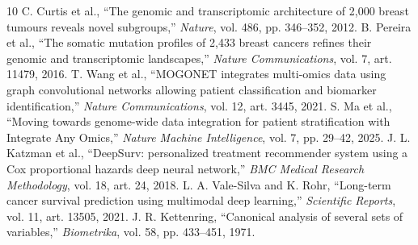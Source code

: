\documentclass{article}
\begin{document}
\begin{thebibliography}{10}\small
{} C. Curtis et al., ``The genomic and transcriptomic architecture
of 2,000 breast tumours reveals novel subgroups,'' \emph{Nature}, vol. 486,
pp. 346--352, 2012.
 B. Pereira et al., ``The somatic mutation profiles of 2,433
breast cancers refines their genomic and transcriptomic landscapes,''
\emph{Nature Communications}, vol. 7, art. 11479, 2016.
 T. Wang et al., ``MOGONET integrates multi-omics data using
graph convolutional networks allowing patient classification and biomarker
identification,'' \emph{Nature Communications}, vol. 12, art. 3445, 2021.
 S. Ma et al., ``Moving towards genome-wide data integration
for patient stratification with Integrate Any Omics,'' \emph{Nature Machine
Intelligence}, vol. 7, pp. 29--42, 2025.
 J. L. Katzman et al., ``DeepSurv: personalized treatment
recommender system using a Cox proportional hazards deep neural network,''
\emph{BMC Medical Research Methodology}, vol. 18, art. 24, 2018.
 L. A. Vale-Silva and K. Rohr, ``Long-term cancer survival
prediction using multimodal deep learning,'' \emph{Scientific Reports},
vol. 11, art. 13505, 2021.
 J. R. Kettenring, ``Canonical analysis of several sets of
variables,'' \emph{Biometrika}, vol. 58, pp. 433--451, 1971.
\end{thebibliography}
\end{document}
